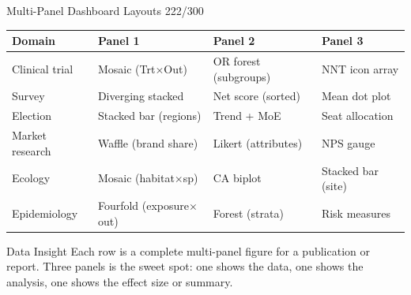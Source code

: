 \documentclass[10pt]{beamer}
\newcommand{\smark}[1]{\hfill{\scriptsize\color{codegray}#1}}
\begin{document}
\begin{frame}{Multi-Panel Dashboard Layouts}
\smark{222/300}
\centering\small
\begin{tabular}{@{}llll@{}}
    \toprule
    \textbf{Domain} & \textbf{Panel 1} & \textbf{Panel 2} & \textbf{Panel 3} \\
    \midrule
    Clinical trial & Mosaic (Trt$\times$Out) & OR forest (subgroups) & NNT icon array \\
    Survey         & Diverging stacked      & Net score (sorted)     & Mean dot plot \\
    Election       & Stacked bar (regions)  & Trend + MoE            & Seat allocation \\
    Market research& Waffle (brand share)   & Likert (attributes)    & NPS gauge \\
    Ecology        & Mosaic (habitat$\times$sp)& CA biplot            & Stacked bar (site) \\
    Epidemiology   & Fourfold (exposure$\times$out)& Forest (strata) & Risk measures \\
    \bottomrule
\end{tabular}

\vspace{0.3cm}
\begin{exampleblock}{Data Insight}
    \scriptsize Each row is a complete multi-panel figure for a publication or report. Three panels is the sweet spot: one shows the data, one shows the analysis, one shows the effect size or summary.
\end{exampleblock}
\end{frame}
\end{document}
